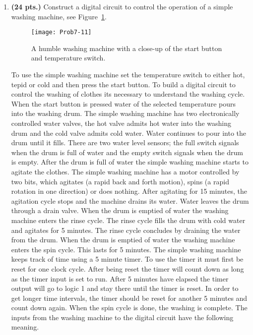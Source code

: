 \begin{enumerate}
    \item \textbf{ (24 pts.)}
        Construct a digital circuit to control the operation of a
        simple washing machine, see Figure~\ref{fig:Wash}.
        \begin{figure}[ht]
            \texttt{[image: Prob7-11]}
            \caption{A humble washing machine with a close-up of the start
            button and temperature switch.}
            \label{fig:Wash}
        \end{figure}

        To use the simple washing machine set the temperature switch to
        either hot, tepid or cold and then press the start button.
        To build a digital circuit to control the washing of clothes
        its necessary to understand the washing cycle.  When the start
        button is pressed water of the selected temperature pours
        into the washing drum.  The simple washing machine has two
        electronically controlled water valves, the hot valve admits
        hot water into the washing drum and the cold valve admits
        cold water.  Water continues to pour into the drum until it
        fills.  There are two water level sensors; the full switch signals when
        the drum is full of water and the empty switch signals when the drum
        is empty.  After the drum is full of water the simple washing machine
        starts to agitate the clothes.  The simple washing machine has a motor
        controlled by two bits, which agitates (a rapid back and forth motion),
        spins (a rapid rotation in one direction) or does nothing.  After
        agitating for 15 minutes, the agitation cycle stops and
        the machine drains its water.  Water leaves the drum through
        a drain valve.  When the drum is emptied of water the washing machine enters
        the rinse cycle.   The rinse cycle fills the drum with cold
        water and agitates for 5 minutes.  The rinse cycle concludes
        by draining the water from the drum.
        When the drum is emptied of water the washing machine enters
        the spin cycle.  This lasts for 5 minutes.  The simple washing machine
        keeps track of time  using a 5 minute timer.   To use the timer
        it must first be reset for one clock cycle.  After being reset the
        timer will count down as long as the timer input is set to run.
        After 5 minutes have elapsed the timer output will go to logic 1 and
        stay there until the timer is reset.  In order to get longer time
        intervals, the timer should be reset for another 5 minutes and count
        down again.  When the spin cycle is done, the washing is complete. The
        inputs from the washing machine to the digital circuit have the
        following meaning.


\end{enumerate}
